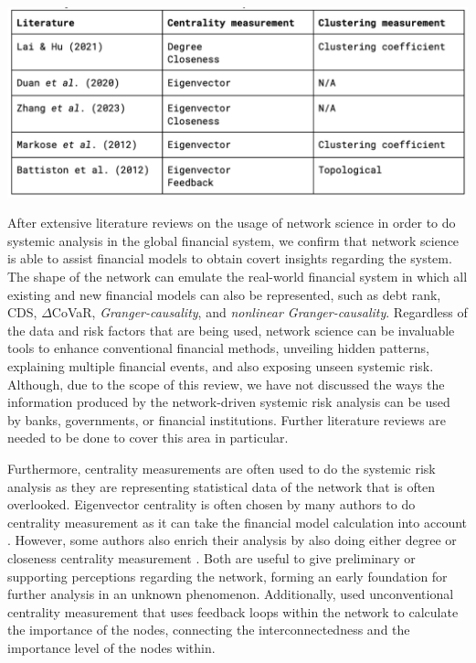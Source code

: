 \documentclass[a4paper,11pt]{article}
\begin{document}
\includegraphics[scale=0.5]{comparison_2.png}

After extensive literature reviews on the usage of network science in order to do systemic analysis in the global financial system, we confirm that network science is able to assist financial models to obtain covert insights regarding the system. The shape of the network can emulate the real-world financial system in which all existing and new financial models can also be represented, such as debt rank, CDS, $\Delta$CoVaR, \textit{Granger-causality}, and \textit{nonlinear Granger-causality}. Regardless of the data and risk factors that are being used, network science can be invaluable tools to enhance conventional financial methods, unveiling hidden patterns, explaining multiple financial events, and also exposing unseen systemic risk. Although, due to the scope of this review, we have not discussed the ways the information produced by the network-driven systemic risk analysis can be used by banks, governments, or financial institutions. Further literature reviews are needed to be done to cover this area in particular.

Furthermore, centrality measurements are often used to do the systemic risk analysis as they are representing statistical data of the network that is often overlooked. Eigenvector centrality is often chosen by many authors to do centrality measurement as it can take the financial model calculation into account \citep{Battiston_Puliga_Kaushik_Tasca_Caldarelli_2012, Duan_El_Ghoul_Guedhami_Li_Li_2020, Markose_Giansante_Shaghaghi_2012, Zhang_Yin_Sha_2023}. However, some authors also enrich their analysis by also doing either degree or closeness centrality measurement \citep{Lai_Hu_2021, Zhang_Yin_Sha_2023}. Both are useful to give preliminary or supporting perceptions regarding the network, forming an early foundation for further analysis in an unknown phenomenon. Additionally, \cite{Battiston_Puliga_Kaushik_Tasca_Caldarelli_2012} used unconventional centrality measurement that uses feedback loops within the network to calculate the importance of the nodes, connecting the interconnectedness and the importance level of the nodes within. 
\end{document}
